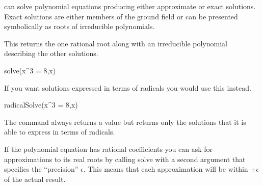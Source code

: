 {{{{{{{{{{{{%

\Language{} can solve polynomial equations producing either approximate
or exact solutions.
Exact solutions are either members of the ground
field or can be presented symbolically as roots of irreducible polynomials.

\begin{xtc}
\begin{xtccomment}
This returns the one rational root along with an irreducible
polynomial describing the other solutions.
\end{xtccomment}
\begin{spadsrc}
solve(x^3  = 8,x)
\end{spadsrc}
\begin{TeXOutput}
\begin{fricasmath}{1}
%
\end{fricasmath}
\end{TeXOutput}
\end{xtc}
\begin{xtc}
\begin{xtccomment}
If you want solutions expressed in terms of radicals you would use this
instead.
\end{xtccomment}
\begin{spadsrc}
radicalSolve(x^3  = 8,x)
\end{spadsrc}
\begin{TeXOutput}
\begin{fricasmath}{2}
%
\end{fricasmath}
\end{TeXOutput}
\end{xtc}

The  command always returns a value but
 returns only the solutions that it is
able to express in terms of radicals.

If the polynomial equation has rational coefficients
you can ask for approximations to its real roots by calling
solve with a second argument that specifies the ``precision''
$\epsilon$.
This means that each approximation will be within
$\pm\epsilon$ of the actual
result.

}}}}}}}}}}}}
